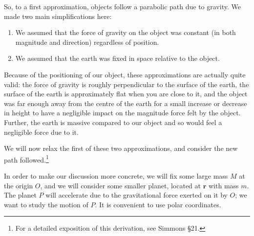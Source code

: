 \documentclass[a4paper,leqno,10pt]{article}
\theoremstyle{exercise}
\theoremstyle{plain}
\theoremstyle{definition}
\theoremstyle{remark}
\renewcommand\vec{\mathbf}
\begin{document}
So, to a first approximation, objects follow a parabolic path due to gravity. We made two main simplifications here:
\begin{enumerate}
  \item We assumed that the force of gravity on the object was constant (in both magnitude and direction) regardless of position.
  \item We assumed that the earth was fixed in space relative to the object.
\end{enumerate}

Because of the positioning of our object, these approximations are actually quite valid: the force of gravity
is roughly perpendicular to the surface of the earth, the surface of the earth is approximately flat when you are close
to it, and the object was far enough away from the centre of the earth for a small increase or decrease in height
to have a negligible impact on the magnitude force felt by the object. Further, the earth is massive compared to our
object and so would feel a negligible force due to it.

We will now relax the first of these two approximations, and consider the new path followed.\footnote{For a detailed
exposition of this derivation, see Simmons \S21.}

In order to make our discussion more concrete, we will fix some large mass $ M $ at the origin $ O $, and we
will consider some smaller planet, located at $ \vec{r} $ with mass $ m $. The planet $ P $ will accelerate due to
the gravitational force exerted on it by $ O $; we want to study the motion of $ P $. It is convenient to use
polar coordinates.
\end{document}
